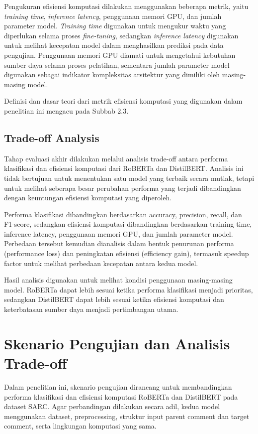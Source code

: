 Pengukuran efisiensi komputasi dilakukan menggunakan beberapa metrik, yaitu \textit{training time}, \textit{inference latency}, penggunaan memori GPU, dan jumlah parameter model. \textit{Training time} digunakan untuk mengukur waktu yang diperlukan selama proses \textit{fine-tuning}, sedangkan \textit{inference latency} digunakan untuk melihat kecepatan model dalam menghasilkan prediksi pada data pengujian. Penggunaan memori GPU diamati untuk mengetahui kebutuhan sumber daya selama proses pelatihan, sementara jumlah parameter model digunakan sebagai indikator kompleksitas arsitektur yang dimiliki oleh masing-masing model.

Definisi dan dasar teori dari metrik efisiensi komputasi yang digunakan dalam penelitian ini mengacu pada Subbab 2.3.

\subsection{Trade-off Analysis}

Tahap evaluasi akhir dilakukan melalui analisis trade-off antara performa klasifikasi dan efisiensi komputasi dari RoBERTa dan DistilBERT. Analisis ini tidak bertujuan untuk menentukan satu model yang terbaik secara mutlak, tetapi untuk melihat seberapa besar perubahan performa yang terjadi dibandingkan dengan keuntungan efisiensi komputasi yang diperoleh.

Performa klasifikasi dibandingkan berdasarkan accuracy, precision, recall, dan F1-score, sedangkan efisiensi komputasi dibandingkan berdasarkan training time, inference latency, penggunaan memori GPU, dan jumlah parameter model. Perbedaan tersebut kemudian dianalisis dalam bentuk penurunan performa (performance loss) dan peningkatan efisiensi (efficiency gain), termasuk speedup factor untuk melihat perbedaan kecepatan antara kedua model.

Hasil analisis digunakan untuk melihat kondisi penggunaan masing-masing model. RoBERTa dapat lebih sesuai ketika performa klasifikasi menjadi prioritas, sedangkan DistilBERT dapat lebih sesuai ketika efisiensi komputasi dan keterbatasan sumber daya menjadi pertimbangan utama.


\section{Skenario Pengujian dan Analisis Trade-off}

Dalam penelitian ini, skenario pengujian dirancang untuk membandingkan performa klasifikasi dan efisiensi komputasi RoBERTa dan DistilBERT pada dataset SARC. Agar perbandingan dilakukan secara adil, kedua model menggunakan dataset, preprocessing, struktur input parent comment dan target comment, serta lingkungan komputasi yang sama.

